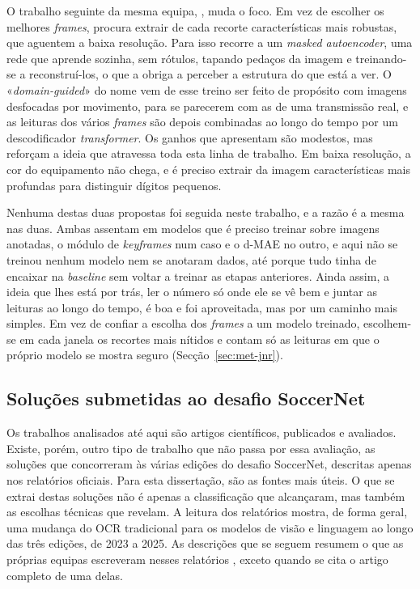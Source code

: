 O trabalho seguinte da mesma equipa, \citet{balaji2024dmae}, muda o foco. Em vez de escolher os melhores \emph{frames}, procura extrair de cada recorte características mais robustas, que aguentem a baixa resolução. Para isso recorre a um \emph{masked autoencoder}, uma rede que aprende sozinha, sem rótulos, tapando pedaços da imagem e treinando-se a reconstruí-los, o que a obriga a perceber a estrutura do que está a ver. O «\emph{domain-guided}» do nome vem de esse treino ser feito de propósito com imagens desfocadas por movimento, para se parecerem com as de uma transmissão real, e as leituras dos vários \emph{frames} são depois combinadas ao longo do tempo por um descodificador \emph{transformer}. Os ganhos que apresentam são modestos, mas reforçam a ideia que atravessa toda esta linha de trabalho. Em baixa resolução, a cor do equipamento não chega, e é preciso extrair da imagem características mais profundas para distinguir dígitos pequenos.

Nenhuma destas duas propostas foi seguida neste trabalho, e a razão é a mesma nas duas. Ambas assentam em modelos que é preciso treinar sobre imagens anotadas, o módulo de \emph{keyframes} num caso e o d-MAE no outro, e aqui não se treinou nenhum modelo nem se anotaram dados, até porque tudo tinha de encaixar na \emph{baseline} sem voltar a treinar as etapas anteriores. Ainda assim, a ideia que lhes está por trás, ler o número só onde ele se vê bem e juntar as leituras ao longo do tempo, é boa e foi aproveitada, mas por um caminho mais simples. Em vez de confiar a escolha dos \emph{frames} a um modelo treinado, escolhem-se em cada janela os recortes mais nítidos e contam só as leituras em que o próprio modelo se mostra seguro (Secção~\ref{sec:met-jnr}).

\subsection{Soluções submetidas ao desafio SoccerNet}\label{sec:jnr-desafio}

Os trabalhos analisados até aqui são artigos científicos, publicados e avaliados. Existe, porém, outro tipo de trabalho que não passa por essa avaliação, as soluções que concorreram às várias edições do desafio SoccerNet, descritas apenas nos relatórios oficiais. Para esta dissertação, são as fontes mais úteis. O que se extrai destas soluções não é apenas a classificação que alcançaram, mas também as escolhas técnicas que revelam. A leitura dos relatórios mostra, de forma geral, uma mudança do OCR tradicional para os modelos de visão e linguagem ao longo das três edições, de 2023 a 2025. As descrições que se seguem resumem o que as próprias equipas escreveram nesses relatórios \citep{cioppa2023soccernet, cioppa2024soccernet, giancola2025soccernet}, exceto quando se cita o artigo completo de uma delas.

